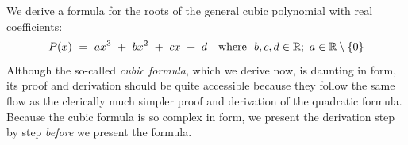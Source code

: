   

We derive a formula for the roots of the general cubic polynomial  with real coefficients:
\begin{equation}
\label{eq:generic-cubic-1}
P(x) \ = \  ax^3 \ + \ bx^2 \ + \ cx \ + \ d \ \ \mbox{  where  }
\ b,c, d  \in \mathbb{R};\ a \in \mathbb{R} \setminus \{0\}
\end{equation}
Although the so-called {\em cubic formula}, which we derive now, is daunting in form, its proof and derivation should be quite accessible because they follow the same flow as the clerically much simpler proof and derivation of the quadratic formula.  Because the cubic formula is so complex in form, we present the derivation step by step {\em before} we present the formula.

